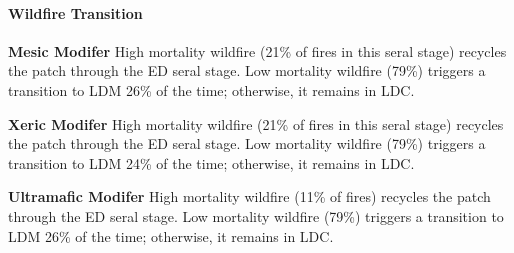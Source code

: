 \paragraph{Wildfire Transition}
\begin{adjustwidth}{2cm}{}
\textbf{Mesic Modifer } High mortality wildfire (21\% of fires in this seral stage) recycles the patch through the ED seral stage. Low mortality wildfire (79\%) triggers a transition to LDM 26\% of the time; otherwise, it remains in LDC.

\medskip
\noindent \textbf{Xeric Modifer} High mortality wildfire (21\% of fires in this seral stage) recycles the patch through the ED seral stage. Low mortality wildfire (79\%) triggers a transition to LDM 24\% of the time; otherwise, it remains in LDC.

\medskip
\noindent \textbf{Ultramafic Modifer} High mortality wildfire (11\% of fires) recycles the patch through the ED seral stage. Low mortality wildfire (79\%) triggers a transition to LDM 26\% of the time; otherwise, it remains in LDC.

\end{adjustwidth}
\noindent\hrulefill

